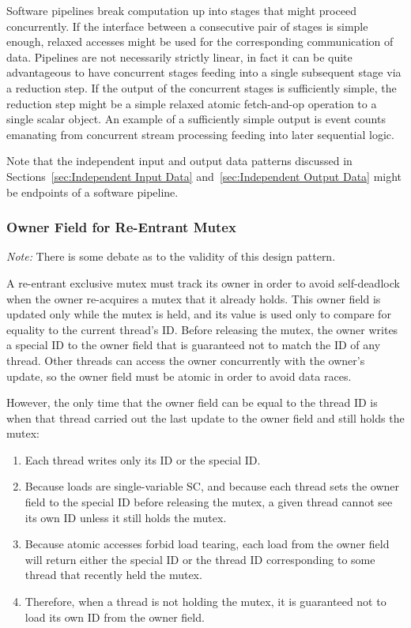 \documentclass[10]{article}
\begin{document}
Software pipelines break computation up into stages that might proceed
concurrently.
If the interface between a consecutive pair of stages is simple enough,
relaxed accesses might be used for the corresponding communication of data.
Pipelines are not necessarily strictly linear, in fact it can be quite
advantageous to have concurrent stages feeding into a single subsequent
stage via a reduction step.
If the output of the concurrent stages is sufficiently simple, the
reduction step might be a simple relaxed atomic fetch-and-op operation
to a single scalar object.
An example of a sufficiently simple output is event counts emanating from
concurrent stream processing feeding into later sequential logic.

Note that the independent input and output data patterns discussed in
Sections~\ref{sec:Independent Input Data} and~\ref{sec:Independent Output Data}
might be endpoints of a software pipeline.

\subsubsection{Owner Field for Re-Entrant Mutex}
\label{sec:Owner Field for Re-Entrant Mutex}

\emph{Note:} There is some debate as to the validity of this design pattern.

A re-entrant exclusive mutex must track its owner in order to avoid
self-deadlock when the owner re-acquires a mutex that it already holds.
This owner field is updated only while the mutex is held, and its value
is used only to compare for equality to the current thread's ID.
Before releasing the mutex, the owner writes a special ID to the owner
field that is guaranteed not to match the ID of any thread.
Other threads can access the owner concurrently with the owner's
update, so the owner field must be atomic in order to avoid data races.

However, the only time that the owner field can be equal to the thread ID
is when that thread carried out the last update to the owner field and
still holds the mutex:

\begin{enumerate}
\item	Each thread writes only its ID or the special ID.
\item	Because  loads are single-variable
	SC, and because each thread sets the owner field to the special
	ID before releasing the mutex, a given thread cannot see its own
	ID unless it still holds the mutex.
\item	Because atomic accesses forbid load tearing, each load from
	the owner field will return either the special ID or the thread
	ID corresponding to some thread that recently held the mutex.
\item	Therefore, when a thread is not holding the mutex, it is guaranteed
	not to load its own ID from the owner field.
\end{enumerate}
\end{document}
